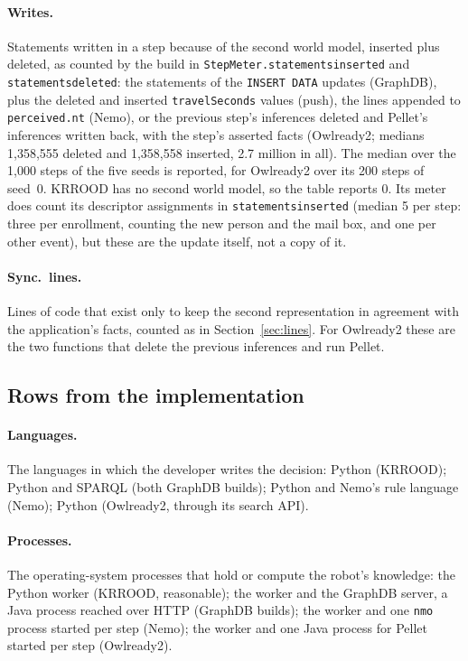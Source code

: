 \documentclass[10pt]{article}
\newcommand{\brkunderscore}{\textunderscore\allowbreak}
\newcommand{\code}[1]{{\let\_\brkunderscore\texttt{#1}}}
\newcommand{\file}[1]{{\let\_\brkunderscore\texttt{#1}}}
\begin{document}
\paragraph{Writes.} Statements written in a step because of the second world model, inserted plus deleted, as counted
by the build in \code{StepMeter.statements\_inserted} and \code{statements\_deleted}: the statements of the
\code{INSERT DATA} updates (GraphDB), plus the deleted and inserted \code{travelSeconds} values (push), the lines
appended to \file{perceived.nt} (Nemo), or the previous step's inferences deleted and Pellet's inferences written back,
with the step's asserted facts (Owlready2; medians 1,358,555 deleted and 1,358,558 inserted, 2.7 million in all). The
median over the 1,000 steps of the five seeds is reported, for Owlready2 over its 200 steps of seed~0. KRROOD has no second
world model, so the table reports 0. Its meter does count its descriptor assignments in \code{statements\_inserted}
(median 5 per step: three per enrollment, counting the new person and the mail box, and one per other event), but these
are the update itself, not a copy of it.

\paragraph{Sync.\ lines.} Lines of code that exist only to keep the second representation in agreement with the
application's facts, counted as in Section~\ref{sec:lines}. For Owlready2 these are the two functions that delete the
previous inferences and run Pellet.

\subsection{Rows from the implementation}

\paragraph{Languages.} The languages in which the developer writes the decision: Python (KRROOD); Python and SPARQL
(both GraphDB builds); Python and Nemo's rule language (Nemo); Python (Owlready2, through its search API).

\paragraph{Processes.} The operating-system processes that hold or compute the robot's knowledge: the Python worker
(KRROOD, reasonable); the worker and the GraphDB server, a Java process reached over HTTP (GraphDB builds); the worker
and one \code{nmo} process started per step (Nemo); the worker and one Java process for Pellet started per step
(Owlready2).
\end{document}

